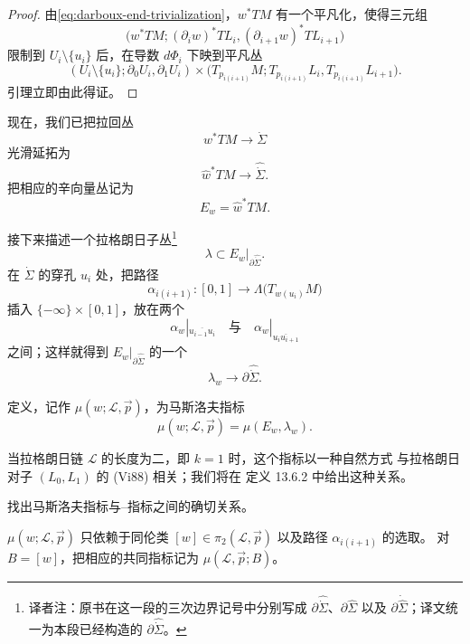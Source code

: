 \begin{proof}
由\eqref{eq:darboux-end-trivialization}，$w^*TM$ 有一个平凡化，使得三元组
\[
  \bigl(w^*TM;(\partial_iw)^*TL_i,
    (\partial_{i+1}w)^*TL_{i+1}\bigr)
\]
限制到 $U_i\setminus\{u_i\}$ 后，在导数 $d\Phi_i$ 下映到平凡丛
\[
  (U_i\setminus\{u_i\};\partial_0U_i,\partial_1U_i)
  \times
  \bigl(T_{p_{i(i+1)}}M;
    T_{p_{i(i+1)}}L_i,T_{p_{i(i+1)}}L_{i+1}\bigr).
\]
引理立即由此得证。
\end{proof}

现在，我们已把拉回丛
\[
  w^*TM\longrightarrow\dot\Sigma
\]
光滑延拓为
\[
  \widehat w^*TM\longrightarrow\widehat{\dot\Sigma}.
\]
把相应的辛向量丛记为
\[
  E_w=\widehat w^*TM.
\]

接下来描述一个拉格朗日子丛\footnote{译者注：原书在这一段的三次边界记号中分别写成
$\partial\widehat{\dot\Sigma}$、$\partial\widehat\Sigma$ 以及
$\partial\dot{\widehat\Sigma}$；译文统一为本段已经构造的
$\partial\widehat{\dot\Sigma}$。}
\[
  \lambda\subset E_w|_{\partial\widehat{\dot\Sigma}}.
\]
在 $\dot\Sigma$ 的穿孔 $u_i$ 处，把路径
\[
  \alpha_{i(i+1)}:[0,1]\longrightarrow
  \Lambda\bigl(T_{w(u_i)}M\bigr)
\]
插入 $\{-\infty\}\times[0,1]$，放在两个\termGaussMap{}
\[
  \alpha_w|_{\overline{u_{i-1}u_i}}
  \quad\text{与}\quad
  \alpha_w|_{\overline{u_i u_{i+1}}}
\]
之间；这样就得到 $E_w|_{\partial\widehat{\dot\Sigma}}$ 的一个\termLagrangianSubbundle{}
\[
  \lambda_w\longrightarrow\partial\widehat{\dot\Sigma}.
\]

\begin{definition}
\label{def:polygonal-maslov-index}
定义\termPolygonalMaslovIndex{}，记作 $\mu(w;\mathcal L,\vec p)$，为马斯洛夫指标
\[
  \mu(w;\mathcal L,\vec p)=\mu(E_w,\lambda_w).
\]
\end{definition}

当拉格朗日链 $\mathcal L$ 的长度为二，即 $k=1$ 时，这个指标以一种自然方式
与拉格朗日对子 $(L_0,L_1)$ 的\termMaslovViterboIndex{} (Vi88) 相关；我们将在
定义 13.6.2 中给出这种关系。

\begin{exercise}
\label{ex:maslov-viterbo-relation}
找出马斯洛夫指标与\personMaslov{}--\personViterbo{}指标之间的确切关系。
\end{exercise}

\begin{proposition}
\label{prop:polygonal-maslov-homotopy-invariance}
$\mu(w;\mathcal L,\vec p)$ 只依赖于同伦类
$[w]\in\pi_2(\mathcal L,\vec p)$ 以及路径 $\alpha_{i(i+1)}$ 的选取。
对 $B=[w]$，把相应的共同指标记为
$\mu(\mathcal L,\vec p;B)$。
\end{proposition}

